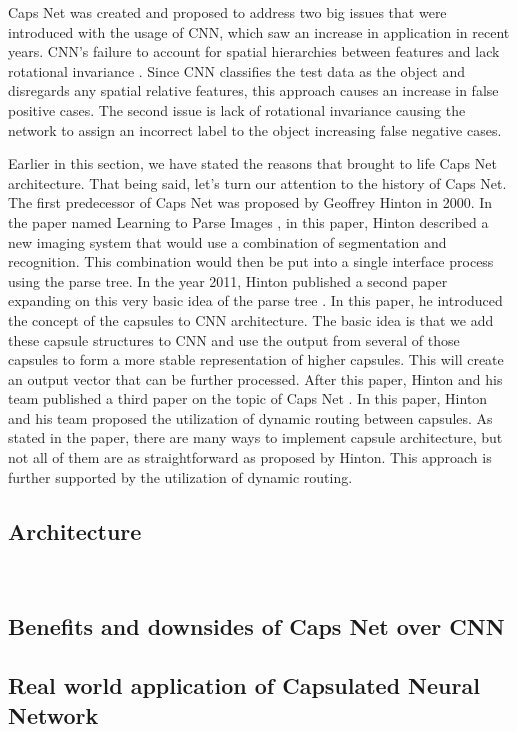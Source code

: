         Caps Net was created and proposed to address two big issues that were introduced with the usage of CNN, which saw an increase in application in recent years. 
        CNN's failure to account for spatial hierarchies between features and lack rotational invariance \cite{Dynamic routing between capsules}. 
        Since CNN classifies the test data as the object and disregards any spatial relative features, this approach causes an increase in false positive cases. 
        The second issue is lack of rotational invariance causing the network to assign an incorrect label to the object increasing false negative cases. 

        Earlier in this section, we have stated the reasons that brought to life Caps Net architecture. That being said, let's turn our attention to the history of Caps Net. 
        The first predecessor of Caps Net was proposed by Geoffrey Hinton in 2000. In the paper named Learning to Parse Images \cite{Learning To Parse Images}, in this paper, Hinton described a new imaging system that would use a combination of segmentation and recognition. 
        This combination would then be put into a single interface process using the parse tree. 
        In the year 2011, Hinton published a second paper expanding on this very basic idea of the parse tree \cite{Transforming Auto-Encoders}. 
        In this paper, he introduced the concept of the capsules to CNN architecture. 
        The basic idea is that we add these capsule structures to CNN and use the output from several of those capsules to form a more stable representation of higher capsules. 
        This will create an output vector that can be further processed.  After this paper, Hinton and his team published a third paper on the topic of Caps Net \cite{Dynamic routing between capsules}. In this paper, Hinton and his team proposed the utilization of dynamic routing between capsules. 
        As stated in the paper, there are many ways to implement capsule architecture, but not all of them are as straightforward as proposed by Hinton. 
        This approach is further supported by the utilization of dynamic routing. 
    \subsection{Architecture}\
    \subsection{Benefits and downsides of Caps Net over CNN}
    \subsection{Real world application of Capsulated Neural Network}

